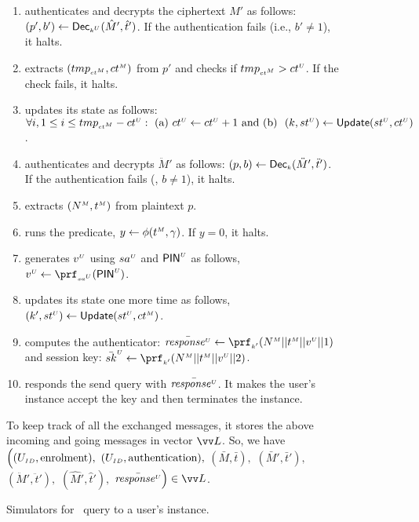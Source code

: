 \begin{figure}[H]
\begin{center}
\begin{tcolorbox}[enhanced,width=3.3in,left=0.1cm, 
    drop fuzzy shadow southwest,
    colframe=black,colback=white]
{{\begin{itemize}[leftmargin=.4cm]
\begin{itemize}[leftmargin=.4cm]
\begin{enumerate}
 \item   authenticates and decrypts the ciphertext $\hat M'$ as follows: $(p', b') \gets \mathsf{Dec}_{\scriptscriptstyle k^{\scriptscriptstyle U}}(\hat M', \hat t')$. If the authentication fails (i.e., $b'\neq 1$), it halts.  
  \item extracts $({tmp}_{\scriptscriptstyle{ct}^{\scriptscriptstyle M}}, {ct}^{\scriptscriptstyle M})$ from $p'$ and checks if ${tmp}_{\scriptscriptstyle{ct}^{\scriptscriptstyle M}} > {ct}^{\scriptscriptstyle U} $. If the check fails, it halts. 
 \item updates its state as follows: $\forall i, 1\leq i\leq {tmp}_{\scriptscriptstyle{ct}^{\scriptscriptstyle M}}- {ct}^{\scriptscriptstyle U}: \text{\ (a)\ } {ct}^{\scriptscriptstyle U} \gets {ct}^{\scriptscriptstyle U} + 1\text{\ and (b) \ } (k,  {st}^{\scriptscriptstyle U}) \gets \mathsf{Update}({st}^{\scriptscriptstyle U}, {ct}^{\scriptscriptstyle U})$. 
 \item  authenticates and decrypts $\ddot M'$ as follows: $(p, b) \gets \mathsf{Dec}_{\scriptscriptstyle k}(\ddot M', \ddot t')$. If the authentication fails (\ie, $b\neq 1$), it halts.
 \item    extracts $({N}^{\scriptscriptstyle M}, {t}^{\scriptscriptstyle M})$ from plaintext $p$.  
 \item runs the predicate, $y \leftarrow\phi({t}^{\scriptscriptstyle M}, \gamma)$. If $y=0$, it halts. 
\item generates ${v}^{\scriptscriptstyle U}$ using ${sa}^{\scriptscriptstyle U}$ and $\mathsf{PIN}^{\scriptscriptstyle U}$ as follows, $\VC{\verifier} \gets \prf_{\sss\VC{\salt}}(\VC{\pin})$.
 \item updates its state one more time as follows, $(k',  {st}^{\scriptscriptstyle U}) \gets \mathsf{Update}({st}^{\scriptscriptstyle U}, {ct}^{\scriptscriptstyle M})$.
 \item computes  the authenticator: $\bar{\VC{\mathit{response}}} \gets \prf_{\sss k'}( \VM{\nonce} || \VM{\trans} || \VC{\verifier}|| 1)$ and session key:  $\bar {sk}^{\sss U} \gets \prf_{\sss k'}( \VM{\nonce} || \VM{\trans} || \VC{\verifier}|| 2)$.
 \item responds the send query with  $\bar{\mathit{response}^{\scriptscriptstyle U}}$. It makes the user's instance accept the key and then terminates the instance. 
 \end{enumerate}
 \end{itemize}
 \end{itemize}
}}
To keep track of all the exchanged messages, it stores the above incoming and going messages in vector $\vv L$. So, we have $\Big((U_{\scriptscriptstyle ID},  \text{enrolment}),$ $ (U_{\scriptscriptstyle ID},  \text{authentication}), $ $(\bar M, \bar t), $ $(\bar M', \bar t'),$ $(\ddot M', \ddot t'), $ $(\hat M', \hat t'), $ $\bar{\VC{\mathit{response}}}\Big)\in \vv L$.
\end{tcolorbox}
\end{center}
\vspace{-3mm}
\caption{Simulators for \send\ query to  a user's instance.} 
\label{fig::Send-sim-to-client}
\end{figure}



